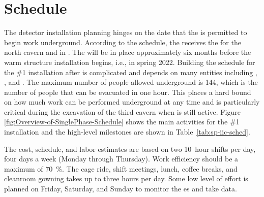 \section{Schedule}

The detector installation planning hinges on the date that the  is permitted to begin work underground. According to the   schedule, the  receives the  for  the north cavern and  in \cucbenocc{}.  The   will be in place approximately six months before the warm structure installation begins, i.e., in spring 2022. Building the schedule for the  \#1 installation after  is  complicated and depends on many entities including , , and .  The maximum number of people allowed underground is 144, which is the number of people that can be evacuated in one hour.  This places a hard bound on how much work can be performed underground at any time and is particularly critical during the excavation of the third cavern when  is still active. Figure \ref{fig:Overview-of-SinglePhase-Schedule} shows the main activities for the  \#1 installation and  the high-level milestones are shown in Table~\ref{tab:sp-iic-sched}.

The cost, schedule, and labor estimates are based on two \SI{10}{hour} shifts per day, four days a week (Monday through Thursday). Work efficiency should be a maximum of \SI{70}{\%}.  The cage ride, shift meetings, lunch, coffee breaks, and cleanroom gowning takes %
up to three hours per day. Some low level of effort is planned on Friday, Saturday, and Sunday to monitor the \coldbox{}es and take data. 

